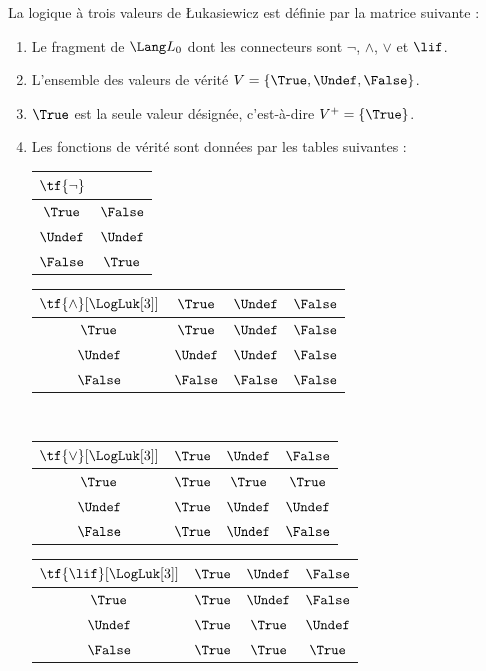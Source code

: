 \documentclass[../../../include/open-logic-section]{subfiles}
\begin{document}
\begin{defn}
La logique à trois valeurs de
\L ukasiewicz est définie par la matrice
suivante :
\begin{enumerate}
  \item Le fragment de $\Lang L_0$ dont les connecteurs sont $\lnot$,
  $\land$, $\lor$ et $\lif$.
  \item L'ensemble des valeurs de vérité
  $V=\{\True,\Undef,\False\}$.
  \item $\True$ est la seule valeur
  désignée, c'est-à-dire
  $V^+=\{\True\}$.
  \item Les fonctions de vérité sont
  données par les tables suivantes :
  \begin{center}
    \begin{tabular}{c|c}
      $\tf{\lnot}$ & \\
      \hline
      $\True$ & $\False$ \\
      $\Undef$ & $\Undef$ \\
      $\False$ & $\True$
    \end{tabular}
    \quad
    \begin{tabular}{c|ccc}
      $\tf{\land}[\LogLuk[3]]$ & $\True$ & $\Undef$ & $\False$ \\
      \hline
      $\True$ & $\True$ & $\Undef$ & $\False$ \\
      $\Undef$ & $\Undef$ & $\Undef$ & $\False$ \\
      $\False$ & $\False$ & $\False$ & $\False$
    \end{tabular}
    \\[2ex]
    \begin{tabular}{c|ccc}
      $\tf{\lor}[\LogLuk[3]]$ & $\True$ & $\Undef$ & $\False$ \\
      \hline
      $\True$ & $\True$ & $\True$ & $\True$ \\
      $\Undef$ & $\True$ & $\Undef$ & $\Undef$ \\
      $\False$ & $\True$ & $\Undef$ & $\False$
    \end{tabular}
    \quad
    \begin{tabular}{c|ccc}
      $\tf{\lif}[\LogLuk[3]]$ & $\True$ & $\Undef$ & $\False$ \\
      \hline
      $\True$ & $\True$ & $\Undef$ & $\False$ \\
      $\Undef$ & $\True$ & $\True$ & $\Undef$ \\
      $\False$ & $\True$ & $\True$ & $\True$
    \end{tabular}
  \end{center}
\end{enumerate}
\end{defn}
\end{document}
